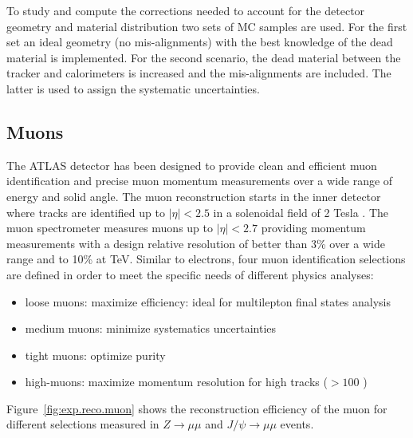 To study and compute the corrections needed to account for the detector geometry and material distribution
two sets of MC samples are used. For the first set an ideal geometry (no mis-alignments) with the best
knowledge of the dead material is implemented. For the second scenario, the dead material between the
tracker and calorimeters is increased and the mis-alignments are included. The latter is used to assign the
systematic uncertainties.








\subsection{Muons}

The ATLAS detector has been designed to provide clean and efficient 
muon identification and precise muon momentum measurements over 
a wide range of energy and solid angle. 
The muon  reconstruction starts in the inner 
detector where tracks are identified up to $|\eta|<2.5$ in a solenoidal field of 2 Tesla .
The muon spectrometer  measures  muons up to $|\eta|<2.7$  
providing momentum measurements with a design relative resolution of better than 3\% over a wide 
\pt range and to 10\% at TeV.
Similar to electrons, four muon identification selections are defined in order to meet 
the specific needs of different physics analyses:
\begin{itemize}
\item loose muons: maximize efficiency: ideal for multilepton final states analysis
\item medium muons: minimize systematics uncertainties
\item tight muons: optimize  purity
\item high-\pt muons: maximize momentum resolution for high \pt tracks ($>100$ \GeV)  
\end{itemize}
Figure~\ref{fig:exp.reco.muon} shows the reconstruction efficiency of the muon for different selections measured in  $Z\to\mu\mu$ and $J/\psi\to\mu\mu$ events.

